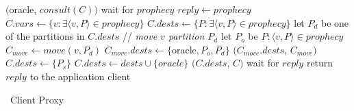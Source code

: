 \begin{algorithm}[h!]
\small

\begin{distribalgo}[1]

\vspace{1.0mm}


\vspace{1.0mm}

        \STATE \amcast$($oracle, $consult(C))$
        \STATE wait for $prophecy$
            \STATE $reply \leftarrow prophecy$
        \ELSE
            \STATE $C.vars \leftarrow \{v: \exists \langle v, P \rangle \in prophecy \}$
            \STATE $C.dests \leftarrow \{P : \exists \langle v, P \rangle \in prophecy \}$
                \STATE let $P_d$ be one of the partitions in $C.dests$
                    \STATE // \textit{move $v$ partition $P_d$}
                    \STATE let $P_o$ be $P : \langle v, P \rangle \in prophecy$
                        \STATE $C_{move} \leftarrow move(v,P_d)$
                        \STATE $C_{move}.dests \leftarrow \{$oracle$,P_o,P_d\}$    
                        \STATE \amcast$(C_{move}.dests$, $C_{move})$
                    \ENDIF
                \ENDFOR
                \STATE $C.dests \leftarrow \{ P_s \}$
            \ENDIF
                \STATE $C.dests \leftarrow dests \cup \{oracle\}$
            \ENDIF
            \STATE \amcast$(C.dests$, $C)$
            \STATE wait for $reply$
        \ENDIF
    \ENDINDENT
    \STATE return $reply$ to the application client
\ENDINDENT

\caption{\dssmr\ Client Proxy}
\label{alg:client_proxy}
\end{distribalgo}
\end{algorithm}